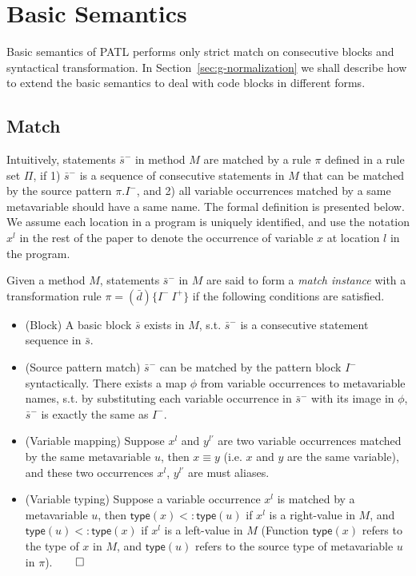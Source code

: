\documentclass[a4paper, USenglish]{lipics-v2016}
\newcommand{\PATL}{PATL\xspace}
\theoremstyle{plain}
\begin{document}


\section{Basic Semantics}\label{sec:basic}

Basic semantics of \PATL performs only strict match on
consecutive blocks and syntactical transformation. In Section~\ref{sec:g-normalization}
we shall describe how to extend the basic semantics to deal with code blocks in
different forms.

\subsection{Match} 

Intuitively, statements $\bar{s}^-$ in method $M$ are matched by a
rule $\pi$ defined in a rule set $\Pi$, if 1) $\bar{s}^-$ is a sequence of consecutive statements in $M$ that can be matched by the source pattern $\pi.I^-$, and 2) all variable occurrences matched by a same metavariable
should have a same name. The formal definition is presented below. We assume each location in a program is uniquely identified, and use the notation $x^l$ in the rest of the paper to denote the occurrence of variable $x$ at location $l$ in the program.

\begin{definition}[Match]
\label{def:match}
Given a method $M$, statements $\bar{s}^{-}$ in $M$ are said to form a \emph{match instance} with a transformation rule $\pi=(\bar{d})\{I^{-}~I^+\}$ if the following conditions are satisfied.
\begin{itemize}
\item (Block) A basic block $\bar{s}$ exists in $M$, s.t. $\bar{s}^{-}$ is a consecutive statement sequence in $\bar{s}$.
\item (Source pattern match) $\bar{s}^{-}$ can be matched by the
  pattern block $I^{-}$ syntactically. There exists a map $\phi$
  from variable occurrences to metavariable names, s.t. by
  substituting each variable occurrence in $\bar{s}^-$ with its image
  in $\phi$, $\bar{s}^-$ is exactly the same as $I^-$.
\item (Variable mapping) Suppose $x^l$ and $y^{l'}$ are two variable occurrences matched by the same metavariable $u$, then $x\equiv y$ (i.e. $x$ and $y$ are the same variable), and these two occurrences $x^l$, $y^{l'}$ are must aliases.
\item (Variable typing) Suppose a variable occurrence $x^l$ is matched by a metavariable $u$, then $\mathsf{type}(x)<:\mathsf{type}(u)$ if $x^l$ is a right-value in $M$, and $\mathsf{type}(u)<:\mathsf{type}(x)$ if $x^l$ is a left-value in $M$ (Function $\mathsf{type}(x)$ refers to the type of $x$ in $M$, and $\mathsf{type}(u)$ refers to the source type of metavariable $u$ in $\pi$).\hfill $\qed$ 
\end{itemize}
\end{definition}
\end{document}
